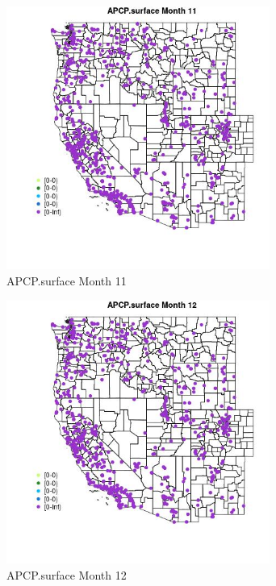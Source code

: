 \begin{figure} 
\centering  
\includegraphics[width=0.77\textwidth]{Code_Outputs/Report_ML_input_PM25_Step4_part_f_de_duplicated_aveswNAs_MapObsMo11APCPsurface.jpg} 
\caption{\label{fig:Report_ML_input_PM25_Step4_part_f_de_duplicated_aveswNAsMapObsMo11APCPsurface}APCP.surface Month 11} 
\end{figure} 
 

\clearpage 

\begin{figure} 
\centering  
\includegraphics[width=0.77\textwidth]{Code_Outputs/Report_ML_input_PM25_Step4_part_f_de_duplicated_aveswNAs_MapObsMo12APCPsurface.jpg} 
\caption{\label{fig:Report_ML_input_PM25_Step4_part_f_de_duplicated_aveswNAsMapObsMo12APCPsurface}APCP.surface Month 12} 
\end{figure} 
 


